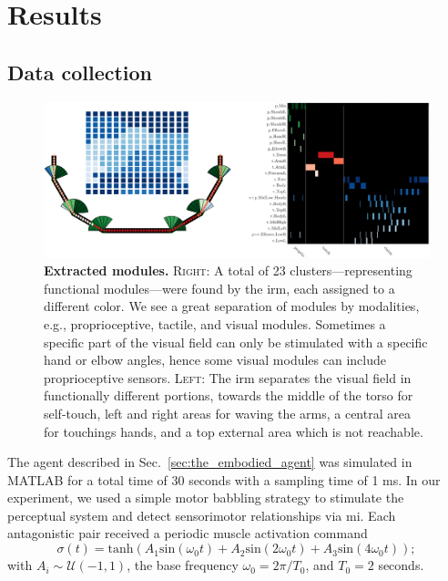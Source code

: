 \section{Results}

\subsection{Data collection}
\begin{figure}[t!]
    \centering
    \includegraphics[height=.35\textwidth]{fig/modules_total.png}
    \caption{\textbf{Extracted modules.} \textsc{Right}: A total of 23 clusters---representing functional modules---were found by the \ac{irm}, each assigned to a different color. We see a great separation of modules by modalities, e.g., proprioceptive, tactile, and visual modules. Sometimes a specific part of the visual field can only be stimulated with a specific hand or elbow angles, hence some visual modules can include proprioceptive sensors. \textsc{Left}: The \ac{irm} separates the visual field in functionally different portions, towards the middle of the torso for self-touch, left and right areas for waving the arms, a central area for touchings hands, and a top external area which is not reachable.}
    \label{fig:irm_modules}
\end{figure}

The agent described in Sec.~\ref{sec:the_embodied_agent} was simulated in MATLAB for a total time of 30 seconds with a sampling time of 1 ms. In our experiment, we used a simple motor babbling strategy to stimulate the perceptual system and detect sensorimotor relationships via \ac{mi}. Each antagonistic pair received a periodic muscle activation command
\begin{equation}\label{eq:motor_babbling_torques}
	\sigma(t) =  \text{tanh} \left( A_1 \text{sin}\left(\omega_0 t\right) + A_2 \text{sin}\left(2\omega_0 t\right) + A_3 \text{sin}\left(4\omega_0 t\right) \right);
\end{equation}	
with $A_i \sim \mathcal{U}(-1,1)$, the base frequency $\omega_0 = 2\pi/T_0$, and $T_0=2$ seconds.

